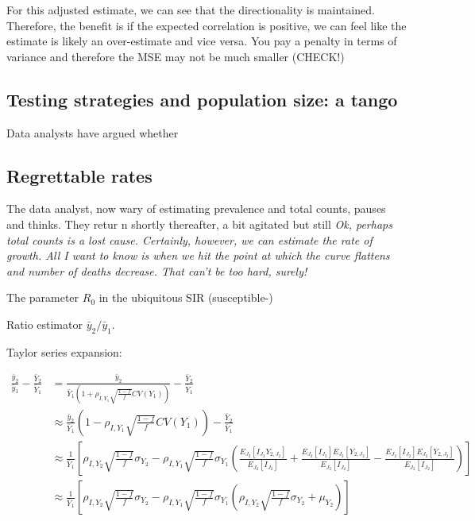 \documentclass[12pt]{article}
\numberwithin{equation}{section}
\theoremstyle{plain}
\begin{document}
For this adjusted estimate, we can see that the directionality is maintained.  Therefore, the benefit is if the expected correlation is positive, we can feel like the estimate is likely an over-estimate and vice versa.  You pay a penalty in terms of variance and therefore the MSE may not be much smaller (CHECK!)


\subsection{Testing strategies and population size: a tango}

Data analysts have argued whether

\subsection{Regrettable rates}

The data analyst, now wary of estimating prevalence and total counts, pauses and thinks.  They retur  n shortly thereafter, a bit agitated but still  \emph{Ok, perhaps total counts is a lost cause. Certainly, however, we can estimate the rate of growth.  All I want to know is when we hit the point at which the curve flattens and number of deaths decrease.  That can't be too hard, surely!}

The parameter $R_0$ in the ubiquitous SIR (susceptible-)

Ratio estimator $\bar y_2/ \bar y_1$.

Taylor series expansion:

$$
\begin{aligned}
\frac{\bar y_2}{\bar y_1} - \frac{\bar Y_2}{\bar Y_1}
&= \frac{\bar y_2}{\bar Y_1  \left(1 + \rho_{I,Y_1} \sqrt{\frac{1-f}{f}} CV (Y_1) \right) } - \frac{\bar Y_2}{\bar Y_1}  \\
&\approx \frac{\bar y_2}{\bar Y_1} \left(1 - \rho_{I,Y_1} \sqrt{\frac{1-f}{f}} CV (Y_1) \right) - \frac{\bar Y_2}{\bar Y_1} \\
&\approx \frac{1}{\bar Y_1} \left[ \rho_{I, Y_2} \sqrt{\frac{1-f}{f}} \sigma_{Y_2} - \rho_{I, Y_1} \sqrt{\frac{1-f}{f}} \sigma_{Y_1}
\left( \frac{E_{J_2} [ I_{J_2} Y_{2,J_2} ]}{E_{J_2} [ I_{J_2} ]} + \frac{E_{J_2} [ I_{J_2} ] E_{J_2} [ Y_{2,J_2} ]}{E_{J_2} [ I_{J_2} ]} - \frac{E_{J_2} [ I_{J_2} ] E_{J_2} [ Y_{2,J_2} ]}{E_{J_2} [ I_{J_2} ]} \right) \right] \\
&\approx \frac{1}{\bar Y_1} \left[ \rho_{I, Y_2} \sqrt{\frac{1-f}{f}} \sigma_{Y_2} - \rho_{I, Y_1} \sqrt{\frac{1-f}{f}} \sigma_{Y_1}
\left( \rho_{I, Y_2} \sqrt{\frac{1-f}{f}} \sigma_{Y_2} + \mu_{Y_2} \right) \right]
\end{aligned}
$$
\end{document}
